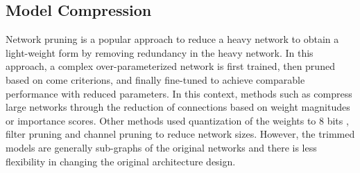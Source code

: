 \documentclass{ecai}
\begin{document}
\subsection{Model Compression}
Network pruning is a popular approach to reduce a heavy network to obtain a light-weight form by removing redundancy in the heavy network. In this approach, a complex over-parameterized network is first trained, then pruned based on come criterions, and finally fine-tuned to achieve comparable performance with reduced parameters. In this context, methods such as \cite{yu2018nisp} compress large networks through the reduction of connections based on weight magnitudes or importance scores. Other methods used quantization of the weights to 8 bits \cite{han2015deep}, filter pruning \cite{li2016pruning} and channel pruning \cite{luo2017thinet} to reduce network sizes. However, the trimmed models are generally sub-graphs of the original networks and there is less flexibility in changing the original architecture design.
\end{document}
